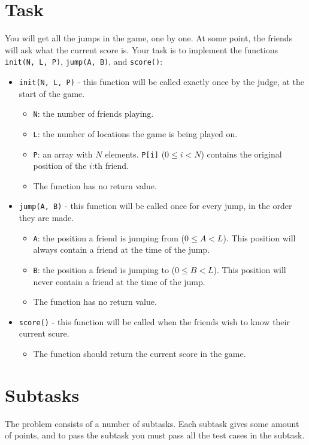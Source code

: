 \section*{Task}
You will get all the jumps in the game, one by one. At some point, the friends will ask what the current score is. Your task is to
implement the functions \texttt{init(N, L, P)}, \texttt{jump(A, B)}, and \texttt{score()}:
\begin{itemize}
  \item \texttt{init(N, L, P)} - this function will be called exactly once by the judge, at the start of the game.
  \begin{itemize}
    \item \texttt{N}: the number of friends playing.
    \item \texttt{L}: the number of locations the game is being played on.
    \item \texttt{P}: an array with $N$ elements. \texttt{P[i]} ($0 \le i < N$) contains the original position of the $i$:th friend.
    \item The function has no return value.
  \end{itemize}

  \item \texttt{jump(A, B)} - this function will be called once for every jump, in the order they are made.
  \begin{itemize}
    \item \texttt{A}: the position a friend is jumping from ($0 \le A < L$). This position will always contain a friend at the time of the jump.
    \item \texttt{B}: the position a friend is jumping to ($0 \le B < L$). This position will never contain a friend at the time of the jump.
    \item The function has no return value.
  \end{itemize}

  \item \texttt{score()} - this function will be called when the friends wish to know their current scure.
  \begin{itemize}
    \item The function should return the current score in the game.
  \end{itemize}

\end{itemize}

\section*{Subtasks}
The problem consists of a number of subtasks. Each subtask gives some amount of points, and to pass
the subtask you must pass all the test cases in the subtask.

